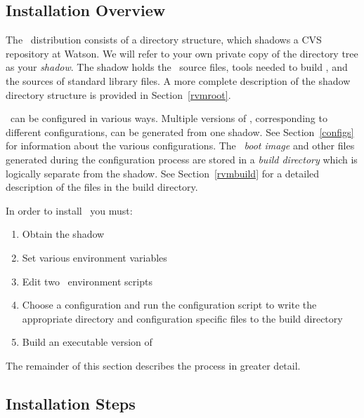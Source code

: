 \subsection{Installation Overview}
The \jp\ distribution consists of a directory structure, which shadows a
CVS repository at Watson. 
We will refer to your own private copy of the 
directory tree as your {\em shadow}.  The shadow holds the \jp\ 
source files, tools needed to build \jp, and the sources of standard
library files. 
A more complete description of the shadow directory structure
is provided in Section~\ref{rvmroot}.

\jp\ can be configured in various ways. Multiple versions of \jp,
corresponding to different configurations, can be generated from 
one shadow. See Section~\ref{configs} for information about the various 
configurations.
The \jp\  {\em boot image} and other files generated during the 
configuration process
are stored in a {\em build directory} which is logically separate from 
the shadow. See Section~\ref{rvmbuild} for a detailed description of the
files in the build directory.

In order to install \jp\  you must:
\begin{enumerate}
\item Obtain the shadow
\item Set various environment variables
\item Edit two \jp\ environment scripts
\item Choose a configuration and run the configuration script to write
the appropriate directory and configuration specific files to the
build directory
\item Build an executable version of \jp
\end{enumerate}

The remainder of this section describes the process in greater detail.

\subsection{Installation Steps}


